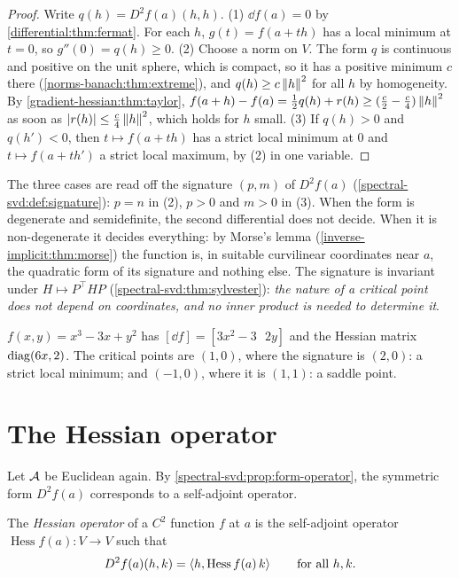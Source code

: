\begin{notechapter}
\begin{proof}
Write $q(h) = D^2f(a)(h, h)$. (1) $\dd f(a) = 0$ by
\cref{differential:thm:fermat}. For each $h$, $g(t) = f(a + th)$ has a
local minimum at $t = 0$, so $g''(0) = q(h)\geq0$. (2) Choose a norm on
$V$. The form $q$ is continuous and positive on the unit sphere, which is
compact, so it has a positive minimum $c$ there
(\cref{norms-banach:thm:extreme}), and $q(h)\geq c\left\|h\right\|^2$ for all $h$
by homogeneity. By \cref{gradient-hessian:thm:taylor},
$f(a + h) - f(a) = \frac12q(h) + r(h)\geq(\frac c2 - \frac c4)\left\|h\right\|^2$
as soon as $\left|r(h)\right|\leq\frac c4\left\|h\right\|^2$, which holds for $h$ small.
(3) If $q(h) > 0$ and $q(h') < 0$, then $t\mapsto f(a + th)$ has a strict
local minimum at $0$ and $t\mapsto f(a + th')$ a strict local maximum, by
(2) in one variable.
\end{proof}

The three cases are read off the signature $(p, m)$ of $D^2f(a)$
(\cref{spectral-svd:def:signature}): $p = n$ in (2), $p > 0$ and $m > 0$
in (3). When the form is degenerate and semidefinite, the second
differential does not decide. When it is non-degenerate it decides
everything: by Morse's lemma (\cref{inverse-implicit:thm:morse}) the
function is, in suitable curvilinear coordinates near $a$, the
quadratic form of its signature and nothing else. The signature is
invariant under
$H\mapsto P^\top HP$ (\cref{spectral-svd:thm:sylvester}): \emph{the nature
of a critical point does not depend on coordinates, and no inner product
is needed to determine it}.

\begin{example}\label{gradient-hessian:ex:critical}
$f(x, y) = x^3 - 3x + y^2$ has $[\dd f] = [3x^2 - 3\ \ \ 2y]$ and the
Hessian matrix $\operatorname{diag}(6x, 2)$. The critical points are $(1, 0)$, where
the signature is $(2, 0)$: a strict local minimum; and $(-1, 0)$, where it
is $(1, 1)$: a saddle point.
\end{example}

\section{The Hessian operator}\label{gradient-hessian:sec:hessian}

Let $\mathcal{A}$ be Euclidean again. By
\cref{spectral-svd:prop:form-operator}, the symmetric form $D^2f(a)$
corresponds to a self-adjoint operator.

\begin{definition}\label{gradient-hessian:def:hessian}
The \emph{Hessian operator} of a $C^2$ function $f$ at $a$ is the
self-adjoint operator $\operatorname{Hess}f(a):V\to V$ such that
\[
  D^2f(a)(h, k) = \left\langle h, \operatorname{Hess}f(a)\,k \right\rangle
  \qquad\text{for all } h, k .
\]
\end{definition}


\end{notechapter}
